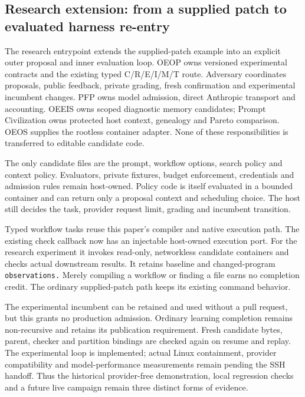 \documentclass[
  11pt,
]{article}
\begin{document}
\subsection{Research extension: from a supplied patch to evaluated
harness
re-entry}\label{research-extension-from-a-supplied-patch-to-evaluated-harness-re-entry}

The research entrypoint extends the supplied-patch example into an
explicit outer proposal and inner evaluation loop. OEOP owns versioned
experimental contracts and the existing typed C/R/E/I/M/T route. Adversary
coordinates proposals, public feedback, private grading, fresh
confirmation and experimental incumbent changes. PFP owns model
admission, direct Anthropic transport and accounting. OEEIS owns scoped
diagnostic memory candidates; Prompt Civilization owns protected host
context, genealogy and Pareto comparison. OEOS supplies the rootless
container adapter. None of these responsibilities is transferred to
editable candidate code.

The only candidate files are the prompt, workflow options, search policy
and context policy. Evaluators, private fixtures, budget enforcement,
credentials and admission rules remain host-owned. Policy code is itself
evaluated in a bounded container and can return only a proposal context
and scheduling choice. The host still decides the task, provider request
limit, grading and incumbent transition.

Typed workflow tasks reuse this paper's compiler and native execution
path. The existing check callback now has an injectable host-owned
execution port. For the research experiment it invokes read-only,
networkless candidate containers and checks actual downstream results.
It retains baseline and changed-program \nolinkurl{observations.} Merely
compiling a workflow or finding a file earns no completion credit. The
ordinary supplied-patch path keeps its existing command behavior.

The experimental incumbent can be retained and used without a pull
request, but this grants no production admission. Ordinary learning
completion remains non-recursive and retains its publication
requirement. Fresh candidate bytes, parent, checker and partition
bindings are checked again on resume and replay. The experimental loop
is implemented; actual Linux containment, provider compatibility and
model-performance measurements remain pending the SSH handoff. Thus the
historical provider-free demonstration, local regression checks and a
future live campaign remain three distinct forms of evidence.
\end{document}
